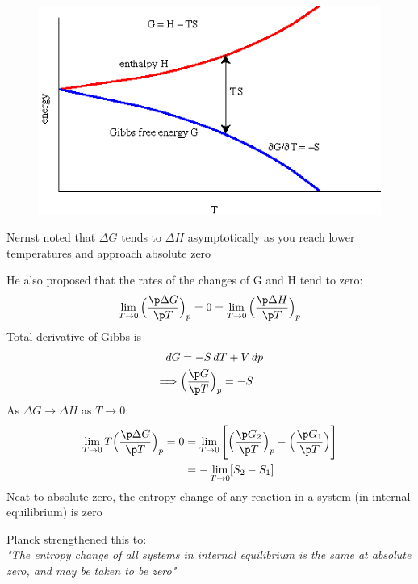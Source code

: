 \documentclass[a4paper, 11pt, normalem]{report}
\begin{document}
\begin{figure}
    \begin{center}
        \includegraphics[scale=0.4]{G-H.png}
        \vspace{-30pt}
    \end{center}
\end{figure}

Nernst noted that $\Delta G$ tends to $\Delta H$ asymptotically as you reach lower temperatures and approach absolute zero

He also proposed that the rates of the changes of G and H tend to zero:
\begin{equation*}
    \lim_{T \to 0} \Big(\frac{\p \Delta G}{\p T}\Big)_p = 0 = \lim_{T \to 0} \Big(\frac{\p \Delta H}{\p T}\Big)_p
\end{equation*}
Total derivative of Gibbs is
\begin{align*}
    dG &= -S\,dT + V\,dp \\
    \implies & \Big(\frac{\p G}{\p T}\Big)_p = -S
\end{align*}
As $\Delta G \to \Delta H$ as $T \to 0$:
\begin{align*}
    \lim_{T \to 0} T\Big(\frac{\p \Delta G}{\p T}\Big)_p = 0 &= \lim_{T \to 0} \Bigg[\Big(\frac{\p G_2}{\p T}\Big)_p - \Big(\frac{\p G_1}{\p T}\Big)\Bigg] \\
    &= -\lim_{T \to 0}[S_2 - S_1]
\end{align*}
Neat to absolute zero, the entropy change of any reaction in a system (in internal equilibrium) is zero

Planck strengthened this to: \\
\emph{"The entropy change of all systems in internal equilibrium is the same at absolute zero, and may be taken to be zero"}
\end{document}
